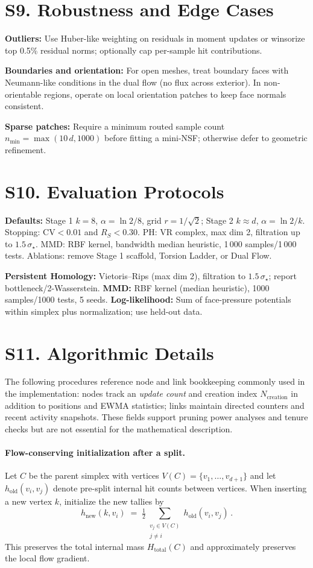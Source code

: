 \documentclass[11pt]{article}
\begin{document}
\section*{S9. Robustness and Edge Cases}
\textbf{Outliers:} Use Huber-like weighting on residuals in moment updates or winsorize top 0.5\% residual norms; optionally cap per-sample hit contributions.

\textbf{Boundaries and orientation:} For open meshes, treat boundary faces with Neumann-like conditions in the dual flow (no flux across exterior). In non-orientable regions, operate on local orientation patches to keep face normals consistent.

\textbf{Sparse patches:} Require a minimum routed sample count $n_{\min}=\max(10\,d, 1000)$ before fitting a mini-NSF; otherwise defer to geometric refinement.

\section*{S10. Evaluation Protocols}
\textbf{Defaults:} Stage 1 $k{=}8$, $\alpha{=}\ln 2/8$, grid $r{=}1/\sqrt{2}$; Stage 2 $k{\approx}d$, $\alpha{=}\ln 2/k$. Stopping: CV$<0.01$ and $R_S{<}0.30$. PH: VR complex, max dim 2, filtration up to $1.5\,\sigma_\star$. MMD: RBF kernel, bandwidth median heuristic, 1\,000 samples/1\,000 tests. Ablations: remove Stage 1 scaffold, Torsion Ladder, or Dual Flow.

\textbf{Persistent Homology:} Vietoris–Rips (max dim 2), filtration to $1.5\,\sigma_\star$; report bottleneck/2-Wasserstein.
\textbf{MMD:} RBF kernel (median heuristic), 1000 samples/1000 tests, 5 seeds.
\textbf{Log-likelihood:} Sum of face-pressure potentials within simplex plus normalization; use held-out data.

\section*{S11. Algorithmic Details}
The following procedures reference node and link bookkeeping commonly used in the implementation: nodes track an \emph{update count} and creation index $N_{\mathrm{creation}}$ in addition to positions and EWMA statistics; links maintain directed counters and recent activity snapshots. These fields support pruning power analyses and tenure checks but are not essential for the mathematical description.

\paragraph{Flow-conserving initialization after a split.}
Let $C$ be the parent simplex with vertices $V(C)=\{v_1,\dots,v_{d{+}1}\}$ and let $h_{\mathrm{old}}(v_i,v_j)$ denote pre-split internal hit counts between vertices. When inserting a new vertex $k$, initialize the new tallies by
\[
  h_{\mathrm{new}}(k,v_i) \;=\; \tfrac{1}{2}\sum_{\substack{v_j\in V(C)\\ j\ne i}} h_{\mathrm{old}}(v_i,v_j)\,.
\]
This preserves the total internal mass $H_{\mathrm{total}}(C)$ and approximately preserves the local flow gradient.
\end{document}
